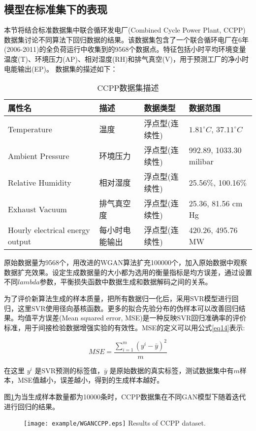 \subsection{模型在标准集下的表现}
本节将结合标准数据集中联合循环发电厂(Combined Cycle Power Plant, CCPP)数据集讨论不同算法下回归数据的结果。该数据集包含了一个联合循环电厂在6年(2006-2011)的全负荷运行中收集到的9568个数据点。特征包括小时平均环境变量温度(T)、环境压力(AP)、相对湿度(RH)和排气真空(V)，用于预测工厂的净小时电能输出(EP)。
数据集的描述如下：
\begin{table}[htpb]
	\centering
	\caption{CCPP数据集描述}
	\label{tabccpp}
	\begin{tabular}{llll} \toprule
		属性名   & 描述 & 数据类型&数据范围  \\  \midrule
		Temperature&温度&浮点型(连续性)&$1.81^\circ C$, $37.11^\circ C$\\
		Ambient Pressure&环境压力&浮点型(连续性)&992.89, 1033.30 milibar\\
		Relative Humidity&相对湿度&浮点型(连续性)& 25.56$\%$, 100.16$\%$ \\
		Exhaust Vacuum&排气真空度&浮点型(连续性)&25.36, 81.56 cm Hg\\
		Hourly electrical energy output&每小时电能输出&浮点型(连续性)&420.26, 495.76 MW\\ \bottomrule
	\end{tabular}
\end{table}

原始数据量为9568个，用改进的WGAN算法扩充100000个，加入原始数据中观察数据扩充效果。设定生成数据量的大小都为选用的衡量指标是均方误差，通过设置不同$lambda$参数，平衡损失函数中数据生成和数据解码之间的关系。

为了评价新算法生成的样本质量，把所有数据归一化后，采用SVR模型进行回归，这里SVR使用径向基核函数。更多的拟合先验分布的伪样本可以改善回归结果。均值平方误差(Mean squared error, MSE)是一种反映SVR回归准确率的评价标准，用于间接检验数据增强实验的有效性。MSE的定义可以用公式\ref{eq14}表示:

\begin{equation}
\label{eq14}
MSE=\frac{\sum \limits_{i=1}^m (y^{i}-\bar{y})^{2}}{m}
\end{equation}

在这里 $y^{i}$ 是SVR预测的标签值，$\bar{y}$ 是原始数据的真实标签，测试数据集中有$m$样本，MSE值越小，误差越小，得到的生成样本越好。

图\ref{figCCPP}为当生成样本数量都为10000条时，CCPP数据集在不同GAN模型下随着迭代进行回归的结果。
\begin{figure}[htbp]
	\centering
	\texttt{[image: example/WGANCCPP.eps]}
	{Results of CCPP dataset.}
	\label{figCCPP}
\end{figure}

